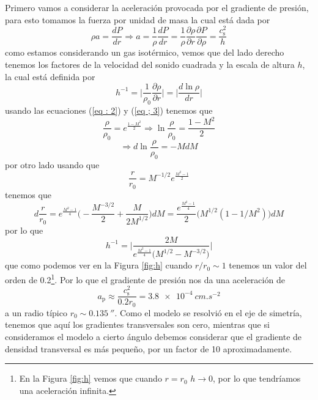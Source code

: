 \documentclass{book}
\begin{document}
Primero vamos a considerar la aceleración provocada por el gradiente de presión, para esto tomamos la fuerza por unidad de masa la cual está dada por 
\begin{equation}
\rho a = \frac{dP}{dr}\Rightarrow a= \frac{1}{\rho}\frac{dP}{dr}=\frac{1}{\rho}\frac{\partial \rho}{\partial r}\frac{\partial P}{\partial\rho}=\frac{c_\mathrm{s}^2}{h}
\end{equation}
como estamos considerando un gas isotérmico, vemos que del lado derecho tenemos los factores de la velocidad del sonido cuadrada y la escala de altura $h$, la cual está definida por 
\begin{equation}
h^{-1}=\Big|\frac{1}{\rho_0}\frac{\partial\rho}{\partial r}\Big|=\Big|\frac{d \ln \rho}{dr}\Big|
\end{equation}
usando las ecuaciones (\ref{eq : 2}) y (\ref{eq ; 3}) tenemos que 
\begin{equation}
\frac{\rho}{\rho_0}=e^{\frac{1-M^2}{2}}\Rightarrow\ln\frac{\rho}{\rho_0}=\frac{1-M^2}{2}
\end{equation}
\begin{equation}
\Rightarrow d\ln\frac{\rho}{\rho_0}=-M dM
\end{equation}
por otro lado usando que 
\begin{equation}
\frac{r}{r_0}=M^{-1/2}e^{\frac{M^2-1}{2}}
\end{equation}
tenemos que 
\begin{equation}
d\frac{r}{r_0}=e^{\frac{M^2-1}{4}}\Big(-\frac{M^{-3/2}}{2}+\frac{M}{2M^{1/2}}\Big)dM = \frac{e^{\frac{M^2-1}{4}}}{2}\Big(M^{1/2}(1-1/M^2) \Big)dM
\end{equation}
por lo que 
\begin{equation}
h^{-1}=\Big|\frac{2M}{e^{\frac{M^2-1}{4}}\Big(M^{1/2}-M^{-3/2}\Big)}\Big|
\end{equation}
que como podemos ver en la Figura \ref{fig:h} cuando $r/r_0\sim 1$ tenemos un valor del orden de 0.2\footnote{En la Figura \ref{fig:h} vemos que cuando $r=r_0$ $h\to 0$, por lo que tendríamos una aceleración infinita.}. Por lo que el gradiente de presión nos da una aceleración de 
\begin{equation}
a_\mathrm{p} \approx \frac{c_\mathrm{s}^2}{0.2 r_0} = \SI{3.8e-4}{cm.s^{-2}}
\end{equation}
a un radio típico $r_0\sim \SI{0.135}{\arcsecond}$. Como el modelo se resolvió en el eje de simetría, tenemos que aquí los gradientes transversales son cero, mientras que si consideramos el modelo a cierto ángulo debemos considerar que el gradiente de densidad transversal es más pequeño, por un factor de 10 aproximadamente. 
\end{document}
